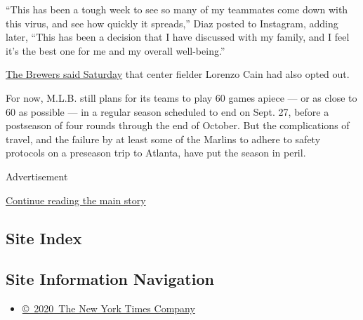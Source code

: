 ``This has been a tough week to see so many of my teammates come down
with this virus, and see how quickly it spreads,'' Diaz posted to
Instagram, adding later, ``This has been a decision that I have
discussed with my family, and I feel it's the best one for me and my
overall well-being.''

\href{https://twitter.com/Brewers/status/1289605514196729856}{The
Brewers said Saturday} that center fielder Lorenzo Cain had also opted
out.

For now, M.L.B. still plans for its teams to play 60 games apiece --- or
as close to 60 as possible --- in a regular season scheduled to end on
Sept. 27, before a postseason of four rounds through the end of October.
But the complications of travel, and the failure by at least some of the
Marlins to adhere to safety protocols on a preseason trip to Atlanta,
have put the season in peril.

Advertisement

\protect\hyperlink{after-bottom}{Continue reading the main story}

\hypertarget{site-index}{%
\subsection{Site Index}\label{site-index}}

\hypertarget{site-information-navigation}{%
\subsection{Site Information
Navigation}\label{site-information-navigation}}

\begin{itemize}
\tightlist
\item
  \href{https://help.nytimes.com/hc/en-us/articles/115014792127-Copyright-notice}{©~2020~The
  New York Times Company}
\end{itemize}

